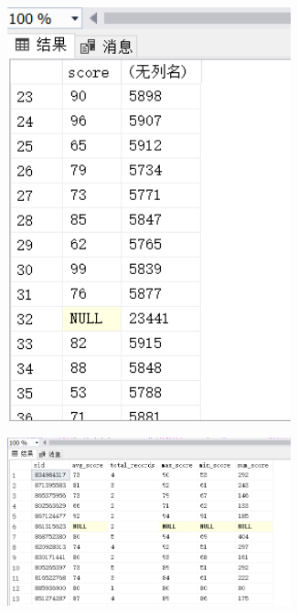 \documentclass[a4paper,twoside]{article}
\begin{document}
\begin{spacing}{1.2}
\begin{enumerate}
\begin{figure}[h]
\centering
\caption{运行结果}
\begin{subfigure}{0.3\textwidth}
  \includegraphics[width=0.9\textwidth]{fig32.png}
\end{subfigure}
\begin{subfigure}{0.3\textwidth}
  \includegraphics[width=0.9\textwidth]{fig33.png}
\end{subfigure}
\end{figure}


\end{enumerate}
\end{spacing}
\end{document}
